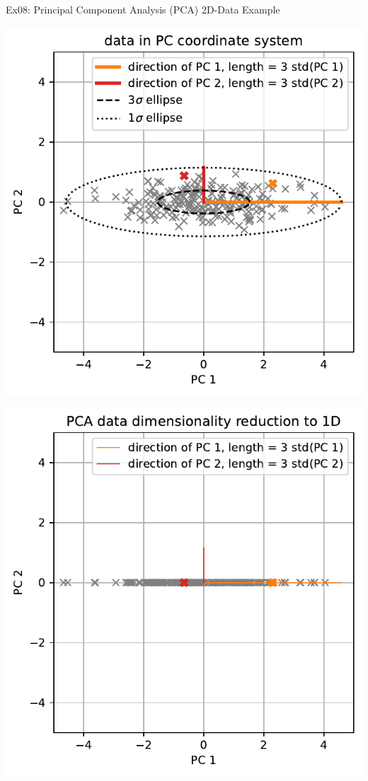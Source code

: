 \documentclass[mathserif, aspectratio=1610]{intbeamer}
\begin{document}
\begin{frame}[t]{Ex08: Principal Component Analysis (PCA) 2D-Data Example}
\begin{minipage}[t]{0.49\textwidth}
\includegraphics[width=\textwidth]{pca_2d_pc_data.pdf}
\end{minipage}
%
\begin{minipage}[t]{0.49\textwidth}
\includegraphics[width=\textwidth]{pca_2d_dim_red.pdf}
\end{minipage}
\end{frame}
\end{document}

